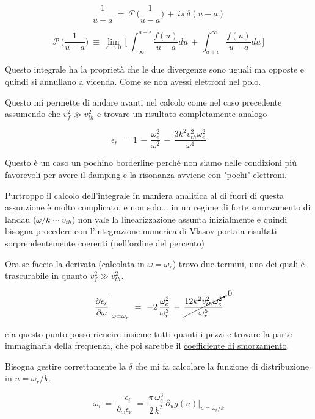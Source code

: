 \[\frac{1}{u-a}\ =\ \mathcal{P}\,\bigg(\frac{1}{u-a}\bigg)\,+\,i\pi\,\delta(u-a)\] 

\[\mathcal{P}\,\bigg(\frac{1}{u-a}\bigg)\ \equiv\  \lim_{\epsilon\to 0}\, \bigg[\,\int_{-\infty}^{a-\epsilon}\frac{f(u)}{u-a}du\, +\, \int^{\infty}_{a+\epsilon}\frac{f(u)}{u-a}du\,\bigg]\]

Questo integrale ha la proprietà che le due divergenze  sono uguali ma opposte e quindi si annullano a vicenda. Come se non avessi elettroni nel polo.

Questo mi permette di andare avanti nel calcolo come nel caso precedente assumendo che $v_f^2\gg v_{th}^2$ e trovare un risultato completamente analogo 

\[\epsilon_r\ =\ 1\, -\, \frac{\omega_e^2}{\omega^2}\, -\, \frac{3k^2v_{th}^2\omega_e^2}{\omega^4}\]

Questo è un caso un pochino borderline perché non siamo nelle condizioni più favorevoli per avere il damping e la risonanza avviene con "pochi" elettroni. 

Purtroppo il calcolo dell'integrale in maniera analitica al di fuori di questa assunzione è molto complicato, e non solo... in un regime di forte smorzamento di landau ($\omega/k\sim v_{th}$) non vale la linearizzazione assunta inizialmente e quindi bisogna procedere con l'integrazione numerica di Vlasov porta a risultati sorprendentemente coerenti (nell'ordine del percento)

Ora se faccio la derivata (calcolata in $\omega=\omega_r$) trovo due termini, uno dei quali è trascurabile in quanto $v_f^2\gg v_{th}^2$. 

\[\frac{\partial \epsilon_r}{\partial\omega}\bigg|_{\omega=\omega_r}\ =\ -2\,\frac{\omega_e^2}{\omega_r^3}\, -\, \cancelto{0}{\frac{12k^2v_{th}^2\omega_e^2}{\omega_r^5}}\]  

e a questo punto posso ricucire insieme tutti quanti i pezzi e trovare la parte immaginaria della frequenza, che poi sarebbe il \underline{coefficiente di smorzamento}. 

Bisogna gestire correttamente la $\delta$ che mi fa calcolare la funzione di distribuzione in $u=\omega_r/k$. 

\[\boxed{\ \omega_i\ =\ \dfrac{-\epsilon_i}{\partial _\omega\epsilon_r}\ =\ \frac{\pi\,\omega_e^3}{2\,k^2}\,\partial_ug(u)\bigg|_{u=\omega_r/k}\ }\]  



%
%
%
